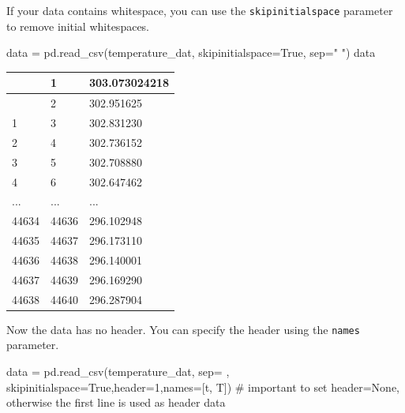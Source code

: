 \documentclass[
  letterpaper,
  DIV=11,
  numbers=noendperiod]{scrreprt}
\newenvironment{Shaded}{\begin{snugshade}}{\end{snugshade}}
\newcommand{\CommentTok}[1]{\textcolor[rgb]{0.37,0.37,0.37}{#1}}
\newcommand{\DecValTok}[1]{\textcolor[rgb]{0.68,0.00,0.00}{#1}}
\newcommand{\NormalTok}[1]{\textcolor[rgb]{0.00,0.23,0.31}{#1}}
\newcommand{\OperatorTok}[1]{\textcolor[rgb]{0.37,0.37,0.37}{#1}}
\newcommand{\StringTok}[1]{\textcolor[rgb]{0.13,0.47,0.30}{#1}}
\newcommand{\VariableTok}[1]{\textcolor[rgb]{0.07,0.07,0.07}{#1}}
\begin{document}
If your data contains whitespace, you can use the
\texttt{skipinitialspace} parameter to remove initial whitespaces.

\begin{Shaded}
\begin{Highlighting}[]
\NormalTok{data }\OperatorTok{=}\NormalTok{ pd.read\_csv(temperature\_dat, skipinitialspace}\OperatorTok{=}\VariableTok{True}\NormalTok{, sep}\OperatorTok{=}\StringTok{" "}\NormalTok{)}
\NormalTok{data}
\end{Highlighting}
\end{Shaded}

\begin{longtable}[]{@{}lll@{}}
\toprule\noalign{}
& 1 & 303.073024218 \\
\midrule\noalign{}
\endhead
\bottomrule\noalign{}
\endlastfoot
0 & 2 & 302.951625 \\
1 & 3 & 302.831230 \\
2 & 4 & 302.736152 \\
3 & 5 & 302.708880 \\
4 & 6 & 302.647462 \\
... & ... & ... \\
44634 & 44636 & 296.102948 \\
44635 & 44637 & 296.173110 \\
44636 & 44638 & 296.140001 \\
44637 & 44639 & 296.169290 \\
44638 & 44640 & 296.287904 \\
\end{longtable}

Now the data has no header. You can specify the header using the
\texttt{names} parameter.

\begin{Shaded}
\begin{Highlighting}[]
\NormalTok{data }\OperatorTok{=}\NormalTok{ pd.read\_csv(temperature\_dat, sep}\OperatorTok{=}\StringTok{\textquotesingle{} \textquotesingle{}}\NormalTok{, skipinitialspace}\OperatorTok{=}\VariableTok{True}\NormalTok{,header}\OperatorTok{=}\DecValTok{1}\NormalTok{,names}\OperatorTok{=}\NormalTok{[}\StringTok{\textquotesingle{}t\textquotesingle{}}\NormalTok{, }\StringTok{\textquotesingle{}T\textquotesingle{}}\NormalTok{])}
\CommentTok{\# important to set header=None, otherwise the first line is used as header}
\NormalTok{data}
\end{Highlighting}
\end{Shaded}
\end{document}
